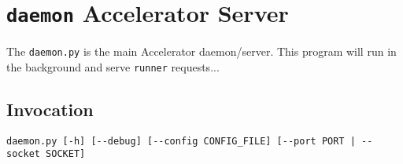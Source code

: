 

\section{\texttt{daemon} Accelerator Server}

The \texttt{daemon.py} is the main Accelerator daemon/server.  This
program will run in the background and serve \texttt{runner} requests...

\subsection{Invocation}

\begin{verbatim}
daemon.py [-h] [--debug] [--config CONFIG_FILE] [--port PORT | --socket SOCKET]
\end{verbatim}

